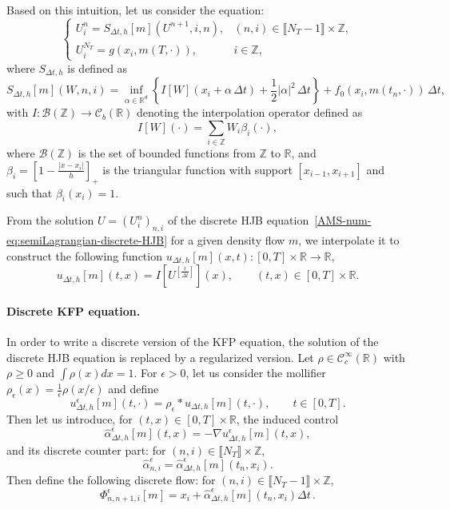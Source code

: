 \documentclass{amsproc}
\theoremstyle{definition}
\theoremstyle{remark}
\numberwithin{equation}{section}
\newcommand{\RR}{{\mathbb R}}
\newcommand{\ZZ}{{\mathbb Z}}
\newcommand{\cB}{{\mathcal B}}
\newcommand{\ctrl}{\alpha}
\begin{document}
Based on this intuition, let us consider the equation:
\begin{equation}
\label{AMS-num-eq:semiLagrangian-discrete-HJB}
\begin{cases}
	U^n_i = S_{\Delta t, h}[m](U^{n+1}, i, n), & (n,i) \in \llbracket N_T-1 \rrbracket \times  \ZZ,
	\\
	U^{N_T}_i = g(x_i, m(T, \cdot)), & i \in \ZZ,
\end{cases}
\end{equation}
where $S_{\Delta t, h}$ is defined as 
\begin{equation}
\label{AMS-num-eq:semiLagrangian-S_Deltat-h}
	S_{\Delta t, h}[m](W, n, i) = \inf_{\ctrl \in \RR^d} \left\{ I[W](x_i + \ctrl \, \Delta t) + \frac{1}{2} |\ctrl|^2 \, \Delta t  \right\} + f_0(x_i, m(t_n, \cdot)) \, \Delta t ,
\end{equation}
with $I: \cB(\ZZ) \to \mathcal{C}_b(\RR)$ denoting the interpolation operator defined as
$$ 
	I[W](\cdot) = \sum_{i \in \ZZ} W_i \beta_i(\cdot), 
$$
where $\cB(\ZZ)$ is the set of bounded functions from $\ZZ$ to $\RR$, and $\beta_i =  \left[ 1 - \frac{|x - x_i|}{h} \right]_+$ is the triangular function with support $[x_{i-1}, x_{i+1}]$ and such that $\beta_i(x_i)=1$.

From the solution $U = (U^n_i)_{n,i}$ of the discrete HJB equation~\eqref{AMS-num-eq:semiLagrangian-discrete-HJB} for a given density flow $m$, we interpolate it to construct the following function $u_{\Delta t, h}[m](x,t):  [0,T] \times \RR \to \RR$,
$$
	u_{\Delta t, h}[m](t,x) = I[U^{[\frac{t}{\Delta t}]}](x), \qquad (t,x) \in [0,T] \times \RR.
$$

\paragraph{\textbf{Discrete KFP equation. }}

In order to write a discrete version of the KFP equation, the solution of the discrete HJB equation is replaced by a regularized version. Let $\rho \in \mathcal{C}^\infty_c(\RR)$ with $\rho \ge 0$ and $\int \rho(x) dx = 1$. For $\epsilon>0$, let us consider the mollifier $\rho_\epsilon(x) = \frac{1}{\epsilon} \rho(x/\epsilon)$ and define 
\begin{equation}
\label{AMS-num-eq:SL-u-epsilon-Deltat-h}
	u^{\epsilon}_{\Delta t, h}[m](t,\cdot) = \rho_\epsilon * u_{\Delta t, h}[m](t,\cdot), \qquad t \in [0,T].	
\end{equation}
Then let us introduce, for $(t,x) \in [0,T] \times \RR$, the induced control
\begin{equation}
\label{AMS-num-eq:SL-hat-ctrl-epsilon-Deltat-h}
	\hat \ctrl^{\epsilon}_{\Delta t, h}[m](t,x) = - \nabla u^{\epsilon}_{\Delta t, h}[m](t,x),
\end{equation}
and its discrete counter part: for $(n,i) \in \llbracket N_T \rrbracket \times \ZZ$,
$$
	\hat \ctrl^{\epsilon}_{n,i} = \hat \ctrl^{\epsilon}_{\Delta t, h}[m](t_n,x_i).
$$
Then define the following discrete flow: for $(n,i) \in \llbracket N_T-1 \rrbracket \times \ZZ$, 
$$
	\Phi^{\epsilon}_{n,n+1,i}[m] = x_i + \hat \ctrl^{\epsilon}_{\Delta t, h}[m](t_n,x_i) \Delta t \, .
$$
\end{document}
